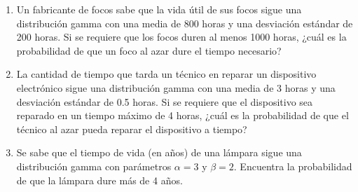 \begin{Ejer}
\begin{enumerate}
    \item Un fabricante de focos sabe que la vida útil de sus focos sigue una distribución gamma con una media de 800 horas y una desviación estándar de 200 horas. Si se requiere que los focos duren al menos 1000 horas, ¿cuál es la probabilidad de que un foco al azar dure el tiempo necesario?
    \item La cantidad de tiempo que tarda un técnico en reparar un dispositivo electrónico sigue una distribución gamma con una media de 3 horas y una desviación estándar de 0.5 horas. Si se requiere que el dispositivo sea reparado en un tiempo máximo de 4 horas, ¿cuál es la probabilidad de que el técnico al azar pueda reparar el dispositivo a tiempo?
    \item Se sabe que el tiempo de vida (en años) de una lámpara sigue una distribución gamma con parámetros $\alpha=3$ y $\beta=2$. Encuentra la probabilidad de que la lámpara dure más de 4 años.

\end{enumerate}
\end{Ejer} 

